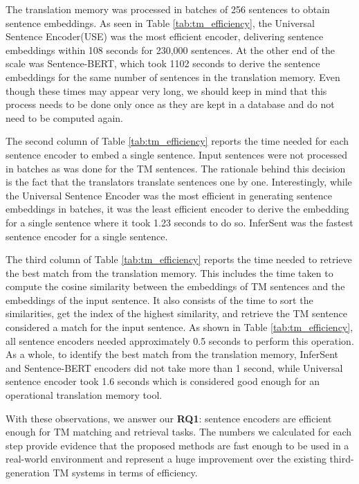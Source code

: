 The translation memory was processed in batches of 256 sentences to obtain sentence embeddings. As seen in Table \ref{tab:tm_efficiency}, the Universal Sentence Encoder(USE) was the most efficient encoder, delivering sentence embeddings within 108 seconds for 230,000 sentences. At the other end of the scale was Sentence-BERT, which took 1102 seconds to derive the sentence embeddings for the same number of sentences in the translation memory. Even though these times may appear very long, we should keep in mind that this process needs to be done only once as they are kept in a database and do not need to be computed again. 

The second column of Table \ref{tab:tm_efficiency} reports the time needed for each sentence encoder to embed a single sentence. Input sentences were not processed in batches as was done for the TM sentences. The rationale behind this decision is the fact that the translators translate sentences one by one. Interestingly, while the Universal Sentence Encoder was the most efficient in generating sentence embeddings in batches, it was the least efficient encoder to derive the embedding for a single sentence where it took 1.23 seconds to do so. InferSent was the fastest sentence encoder for a single sentence. 

The third column of Table \ref{tab:tm_efficiency} reports the time needed to retrieve the best match from the translation memory. This includes the time taken to compute the cosine similarity between the embeddings of TM sentences and the embeddings of the input sentence. It also consists of the time to sort the similarities, get the index of the highest similarity, and retrieve the TM sentence considered a match for the input sentence. As shown in Table \ref{tab:tm_efficiency}, all sentence encoders needed approximately 0.5 seconds to perform this operation. As a whole, to identify the best match from the translation memory, InferSent and Sentence-BERT encoders did not take more than 1 second, while Universal sentence encoder took 1.6 seconds which is considered good enough for an operational translation memory tool. 

With these observations, we answer our \textbf{RQ1}: sentence encoders are efficient enough for TM matching and retrieval tasks. The numbers we calculated for each step provide evidence that the proposed methods are fast enough to be used in a real-world environment and represent a huge improvement over the existing third-generation TM systems in terms of efficiency.


